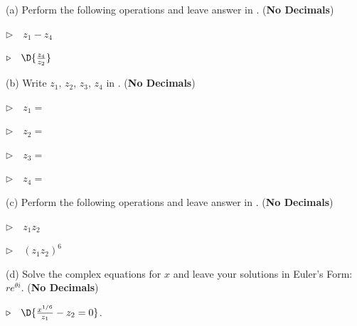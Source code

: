 \documentclass[12pt]{amsart}
\numberwithin{equation}{section}
\begin{document}
\noindent(a) Perform the following operations and leave answer in . ({\bf No Decimals})

\vspace{0.3cm}

\qquad $\triangleright \quad z_1 - z_4$

\vspace{1.0cm}

\qquad $\triangleright \quad \D{\frac{z_4}{z_2}}$

\vspace{1.0cm}

\noindent(b) Write $z_1, \, z_2, \, z_3, \, z_4$ in . ({\bf No Decimals})

\vspace{0.3cm}

\qquad $\triangleright \quad z_1 = $

\vspace{1.2cm}

\qquad $\triangleright \quad z_2 = $

\vspace{1.2cm}

\qquad $\triangleright \quad z_3 = $

\vspace{1.2cm}

\qquad $\triangleright \quad z_4 = $

\vspace{1.2cm}

\noindent(c) Perform the following operations and leave answer in . ({\bf No Decimals})

\vspace{0.8cm}

\qquad $\triangleright \quad z_1z_2$

\vspace{1.5cm}

\qquad $\triangleright \quad (z_1z_2)^6$

\vspace{1.5cm}

\noindent(d) Solve the complex equations for $x$ and leave your solutions in Euler's Form: $re^{\theta i}$. ({\bf No Decimals})

\vspace{0.6cm}

\qquad $\triangleright \quad \D{\frac{x^{1/6}}{z_1} - z_2 = 0}$.

\vspace{2.5cm}
\end{document}
